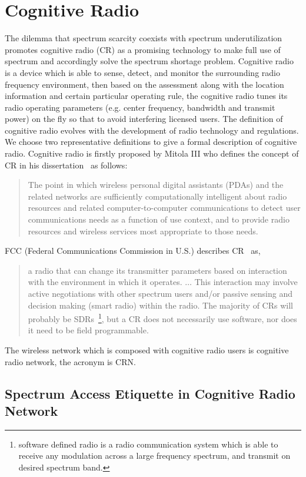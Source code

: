 \section{Cognitive Radio}
The dilemma that spectrum scarcity coexists with spectrum underutilization promotes cognitive radio (CR) as a promising technology to make full use of spectrum and accordingly solve the spectrum shortage problem.
Cognitive radio is a device which is able to sense, detect, and monitor the surrounding radio frequency environment, then based on the assessment along with the location information and certain particular operating rule, the cognitive radio tunes its radio operating parameters (e.g. center frequency, bandwidth and transmit power) on the fly so that to avoid interfering licensed users.
The definition of cognitive radio evolves with the development of radio technology and regulations.
We choose two representative definitions to give a formal description of cognitive radio.
Cognitive radio is firstly proposed by Mitola III who defines the concept of CR in his dissertation~\cite{2000mitola_cognitive_radio} as follows:
\blockquote{The point in which wireless personal digital assistants (PDAs) and the related networks are sufficiently computationally intelligent about radio resources and related computer-to-computer communications to detect user communications needs as a function of use context, and to provide radio resources and wireless services most appropriate to those needs.
}

FCC (Federal Communications Commission in U.S.) describes CR~\cite{FCC_03-322} as,
\blockquote{
a radio that can change its transmitter parameters based on interaction with the environment in which it operates. $\ldots$
This interaction may involve active negotiations with other spectrum users and/or passive sensing and decision making (smart radio) within the radio. The majority of CRs will probably be SDRs~\footnote{software defined radio is a radio communication system which is able to receive any modulation across a large frequency spectrum, and transmit on desired spectrum band.}, but a CR does not necessarily use software, nor does it need to be field programmable.
}

The wireless network which is composed with cognitive radio users is cognitive radio network, the acronym is CRN.

\subsection{Spectrum Access Etiquette in Cognitive Radio Network}

